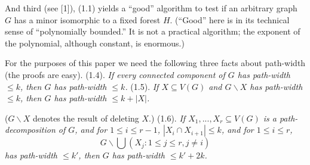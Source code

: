 And third (see [1]), (1.1) yields a ``good'' algorithm to test if an arbitrary
graph $G$ has a minor isomorphic to a fixed forest $H$. (``Good'' here is in its
technical sense of ``polynomially bounded.'' It is not a practical algorithm;
the exponent of the polynomial, although constant, is enormous.)

For the purposes of this paper we need the following three facts about
path-width (the proofs are easy).
\stmt
(1.4). \textit{If every connected component of $G$ has path-width $\le k$, then $G$ has
path-width $\le k$.}
\stmt
(1.5). \textit{If $X\subseteq V(G)$ and $G\backslash X$ has path-width $\le k$, then $G$ has path-width $\le k+|X|$.}

($G\backslash X$ denotes the result of deleting $X$.)
\stmt
(1.6). \textit{If $X_1,..., X_r\subseteq V(G)$ is a path-decomposition of $G$, and for
$1\le i\le r-1$, $|X_i\cap X_{i+1}|\le k$, and for $1\le i\le r$,}
\begin{equation*}
G\backslash\bigcup(X_j\colon 1\le j\le r, j\ne i)
\end{equation*}
\textit{has path-width $\le k'$, then $G$ has path-width $\le k'+2k$.}

